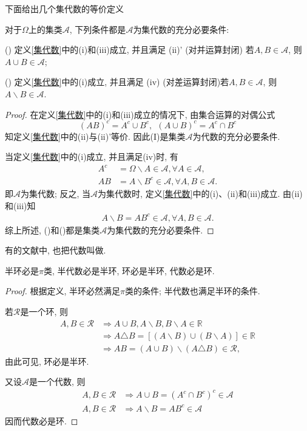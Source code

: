 下面给出几个集代数的等价定义
\begin{lemma}
	对于$\Omega$上的集类$\mathscr{A}$, 下列条件都是$\mathscr{A}$为集代数的充分必要条件:
	\begin{blist}
		\item[(\RNum{1})] 定义\ref{集代数}中的(i)和(iii)成立, 并且满足
		(ii)' (对并运算封闭) 若$A,B\in\mathscr{A}$, 则$A\cup B\in\mathscr{A}$;
		\item[(\RNum{2})] 定义\ref{集代数}中的(i)成立, 并且满足
		(iv) (对差运算封闭)若$A,B\in\mathscr{A}$, 则$A\backslash B\in\mathscr{A}$.
	\end{blist}
\end{lemma}
\begin{proof}
	在定义\ref{集代数}中的(i)和(iii)成立的情况下, 由集合运算的对偶公式\begin{equation}
	(AB)^c = A^c\cup B^c,~~(A\cup B)^c = A^c\cap B^c
	\end{equation}
	知定义\ref{集代数}中的(ii)与(ii)'等价. 因此(I)是集类$\mathscr{A}$为代数的充分必要条件.
	
	当定义\ref{集代数}中的(i)成立, 并且满足(iv)时, 有
	\begin{align}
	A^c &= \Omega\backslash A\in\mathscr{A},\forall A\in\mathscr{A},\nonumber\\
	AB &= A\backslash B^c \in\mathscr{A},\forall A,B\in\mathscr{A}.
	\end{align}
	即$\mathscr{A}$为集代数; 反之, 当$\mathscr{A}$为集代数时, 定义\ref{集代数}中的(i)、(ii)和(iii)成立. 由(ii)和(iii)知
	\begin{align}
	A\backslash B = AB^c\in\mathscr{A},\forall A,B\in\mathscr{A}.
	\end{align}
	综上所述, ()和()都是集类$\mathscr{A}$为集代数的充分必要条件.
\end{proof}
\begin{note}
	有的文献中, 也把代数叫做.	
\end{note}
\begin{lemma}
	半环必是$\pi$类, 半代数必是半环, 环必是半环, 代数必是环. 
\end{lemma}
\begin{proof}
	根据定义, 半环必然满足$\pi$类的条件; 半代数也满足半环的条件.
	
	若$\mathscr{R}$是一个环, 则\begin{align}
	A,B\in\mathscr{R}&\Rightarrow A\cup B,A\backslash B, B\backslash A\in\mathbb{R}\nonumber\\
	&\Rightarrow A\triangle B = \left[ (A\backslash B)\cup (B\backslash A) \right]\in\mathbb{R}\nonumber\\
	&\Rightarrow AB = (A\cup B)\backslash (A\triangle B)\in\mathscr{R},
	\end{align}
	由此可见, 环必是半环.
	
	又设$\mathscr{A}$是一个代数, 则\begin{align}
	A,B\in\mathscr{R}&\Rightarrow  A\cup B = (A^c\cap B^c)^c\in\mathscr{A}\nonumber\\
	A,B\in\mathscr{R}&\Rightarrow A\backslash B = AB^c\in\mathscr{A}
	\end{align}
	因而代数必是环.
\end{proof}

